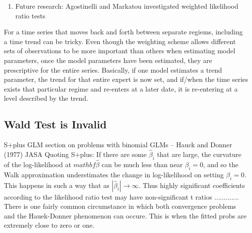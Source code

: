\documentclass[12pt]{article}
\begin{document}

\begin{enumerate}
\item Future research: Agostinelli and Markatou \cite{AgostinelliMarkatou} investigated weighted likelihood ratio tests
\end{enumerate}

For a time series that moves back and forth between separate regiems, including a time trend can be tricky. Even though the weighting scheme allows different sets of observations to be more important than others when estimating model parameters, once the model parameters have been estimated, they are prescriptive for the entire series. Basically, if one model estimates a trend parameter, the trend for that entire expert is now set, and if/when the time series exists that particular regime and re-enters at a later date, it is re-entering at a level described by the trend.

\subsection{Wald Test is Invalid}
S+plus GLM section on problems with binomial GLMs
  -- Hauck and Donner (1977) JASA \cite{HauckDonner} Quoting S+plus: If there are some $\hat{\beta}_{i}$ that are large, the curvature of the log-likelihood at $mathbf{\hat{\beta}}$ can be much less than near $\beta_{i}=0$, and so the Walk approximation understimates the change in log-likelihood on setting $\beta_{i}=0$. This happens in such a way that as $|\hat{\beta}_{i}| \rightarrow \infty$. Thus highly significant coefficients according to the likelihood ratio test may have non-significant t ratios ............. There is one fairly common circumstance in which both convergence problems and the Hauek-Donner phenomenon can occure. This is when the fitted probs are extremely close to zero or one.
\end{document}
